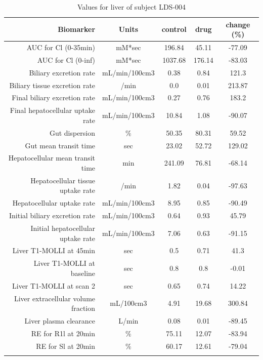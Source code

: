 \documentclass{epflreport}%
\begin{document}
%
\clearpage%
\begin{longtable}{rcccc}%
\hline%
Biomarker&Units&control&drug&change (\%)\\%
\hline%
AUC for Cl (0{-}35min)&mM*sec&196.84&45.11&{-}77.09\\%
AUC for Cl (0{-}inf)&mM*sec&1037.68&176.14&{-}83.03\\%
Biliary excretion rate&mL/min/100cm3&0.38&0.84&121.3\\%
Biliary tissue excretion rate&/min&0.0&0.01&213.87\\%
Final biliary excretion rate&mL/min/100cm3&0.27&0.76&183.2\\%
Final hepatocellular uptake rate&mL/min/100cm3&10.84&1.08&{-}90.07\\%
Gut dispersion&\%&50.35&80.31&59.52\\%
Gut mean transit time&sec&23.02&52.72&129.02\\%
Hepatocellular mean transit time&min&241.09&76.81&{-}68.14\\%
Hepatocellular tissue uptake rate&/min&1.82&0.04&{-}97.63\\%
Hepatocellular uptake rate&mL/min/100cm3&8.95&0.85&{-}90.49\\%
Initial biliary excretion rate&mL/min/100cm3&0.64&0.93&45.79\\%
Initial hepatocellular uptake rate&mL/min/100cm3&7.06&0.63&{-}91.15\\%
Liver T1{-}MOLLI at 45min&sec&0.5&0.71&41.3\\%
Liver T1{-}MOLLI at baseline&sec&0.8&0.8&{-}0.01\\%
Liver T1{-}MOLLI at scan 2&sec&0.65&0.74&14.22\\%
Liver extracellular volume fraction&mL/100cm3&4.91&19.68&300.84\\%
Liver plasma clearance&L/min&0.08&0.01&{-}89.45\\%
RE for R1l at 20min&\%&75.11&12.07&{-}83.94\\%
RE for Sl at 20min&\%&60.17&12.61&{-}79.04\\%
\hline%
\caption{Values for liver of subject LDS-004} \\%
\end{longtable}%
\end{document}
